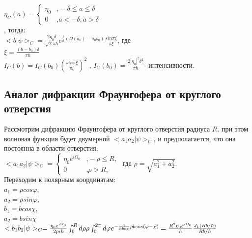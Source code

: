 \documentclass[11pt]{report}
\begin{document}
$
\eta_C(a) =
\left\{
\begin{array}{lr}
\eta_0 & \text{,}-\delta \leq a \leq \delta \\
0 & \text{,} a < -\delta, a>\delta
\end{array}
\right.
$ \\

, тогда: \\

$<b|\psi>_C=\frac{2\eta_0\delta}{\sqrt2\pi\hbar}e^{\frac{i}{\hbar}(\Omega(a_0)-a_0b_0)}\frac{sin\pi\xi}{\pi\xi}$, где \\

$\xi = \frac{(b-b_0)\delta}{\pi\hbar}$ \\

$I_C(b)=I_C(b_0)(\frac{sin\pi\xi}{\pi\xi})^2$ , $I_C(b_0)=\frac{2|\eta_0|^2\delta^2}{\pi \hbar }$- интенсивности.

\subsection{Аналог дифракции Фраунгофера от круглого отверстия}
Рассмотрим дифракцию Фраунгофера от круглого отверстия радиуса $R$. при этом волновая функция будет двумерной $<a_1a_2|\psi>_C$, и предполагается, что она постоянна в области отверстия: \\

$
<a_1a_2|\psi>_C =
\left\{
\begin{array}{lr}
\eta_0e^{i\Omega_0} & \text{,}-\rho \leq R, \\
0 & \text{,} \rho> R,
\end{array}
\right.
$ где $\rho=\sqrt{a_1^2+a_2^2}$.\\

Переходим к полярным координатам: \\ 

$a_1 = \rho cos \varphi $, \\

$a_2 = \rho sin\varphi $, \\

$b_1 = b cos \chi $, \\

$a_2 = b sin\chi $\\

$<b_1b_2|\psi>_C = \frac{\eta_0e^{i\Omega_0}}{2pi\hbar}\int_0^Rd\rho\rho \int_0^{2\pi}d\varphi e^{-\frac{i}{\\hbar}\rho b cos(\varphi - \chi)} = \frac{R^2\eta_0e^{i\Omega_0}}{\hbar} \frac{J_1(Rb/\hbar)}{Rb/\hbar }$\\
\end{document}

